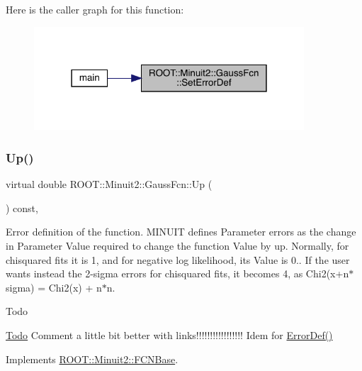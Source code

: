 Here is the caller graph for this function\+:\nopagebreak
\begin{figure}[H]
\begin{center}
\leavevmode
\includegraphics[width=286pt]{de/dc1/classROOT_1_1Minuit2_1_1GaussFcn_ad6ab65c15a43f72db27fd6ddf26486f9_icgraph}
\end{center}
\end{figure}
\mbox{\label{classROOT_1_1Minuit2_1_1GaussFcn_a7e73468f853c287df3b5da240c3b5bb5}} 
\subsubsection{\texorpdfstring{Up()}{Up()}}
{\footnotesize\ttfamily virtual double R\+O\+O\+T\+::\+Minuit2\+::\+Gauss\+Fcn\+::\+Up (\begin{DoxyParamCaption}{ }\end{DoxyParamCaption}) const\hspace{0.3cm}{\ttfamily [inline]}, {\ttfamily [virtual]}}

Error definition of the function. M\+I\+N\+U\+IT defines Parameter errors as the change in Parameter Value required to change the function Value by up. Normally, for chisquared fits it is 1, and for negative log likelihood, its Value is 0.. If the user wants instead the 2-\/sigma errors for chisquared fits, it becomes 4, as Chi2(x+n$\ast$sigma) = Chi2(x) + n$\ast$n.

\begin{DoxyRefDesc}{Todo}
\item[\mbox{\hyperlink{todo__todo000001}{Todo}}]Comment a little bit better with links!!!!!!!!!!!!!!!!! Idem for \mbox{\hyperlink{classROOT_1_1Minuit2_1_1FCNBase_ac4592475c58a65b037ba97ab5f3cba10}{Error\+Def()}}\end{DoxyRefDesc}


Implements \mbox{\hyperlink{classROOT_1_1Minuit2_1_1FCNBase_a04ef08ddad92ce8d89d498efbe021c39}{R\+O\+O\+T\+::\+Minuit2\+::\+F\+C\+N\+Base}}.

